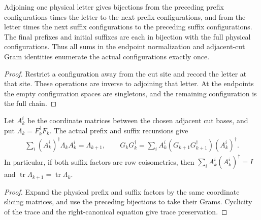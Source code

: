 \begin{lemma}
    \label{lem:obc_canonical_configurations_endpoints}
    \leanok
    Adjoining one physical letter gives bijections from the preceding
    prefix configurations times the letter to the next prefix
    configurations, and from the letter times the next suffix
    configurations to the preceding suffix configurations. The final
    prefixes and initial suffixes are each in bijection with the full
    physical configurations. Thus all sums in the endpoint normalization
    and adjacent-cut Gram identities enumerate the actual configurations
    exactly once.
\end{lemma}
\begin{proof}
    \leanok
    Restrict a configuration away from the cut site and record the
    letter at that site. These operations are inverse to adjoining
    that letter. At the endpoints the empty configuration spaces are
    singletons, and the remaining configuration is the full chain.
\end{proof}

\begin{lemma}
    \label{lem:obc_canonical_cut_recurrences}
    \leanok
    Let $A_k^i$ be the coordinate matrices between the chosen adjacent
    cut bases, and put $\Lambda_k=F_k^\dagger F_k$. The actual prefix
    and suffix recursions give
    \begin{align}
        \sum_i(A_k^i)^\dagger\Lambda_kA_k^i=\Lambda_{k+1},
        \qquad
        G_kG_k^\dagger=
        \sum_i A_k^i(G_{k+1}G_{k+1}^\dagger)(A_k^i)^\dagger.
    \end{align}
    In particular, if both suffix factors are row coisometries, then
    $\sum_i A_k^i(A_k^i)^\dagger=I$ and
    $\operatorname{tr}\Lambda_{k+1}=\operatorname{tr}\Lambda_k$.
\end{lemma}
\begin{proof}
    \leanok
    Expand the physical prefix and suffix factors by the same coordinate
    slicing matrices, and use the preceding bijections to take their
    Grams. Cyclicity of the trace and the right-canonical equation
    give trace preservation.
\end{proof}

